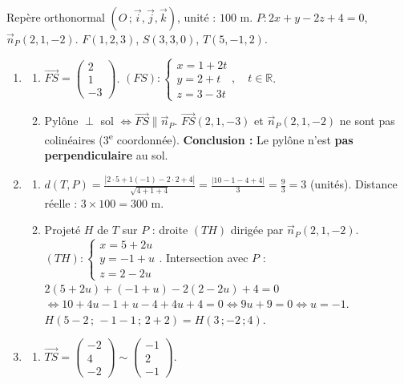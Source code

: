\documentclass[11pt]{article}
\begin{document}
\begin{corrige}
Repère orthonormal $(O\,;\vec{i},\vec{j},\vec{k})$, unité : $100$ m.
$P : 2x+y-2z+4=0$, $\vec{n}_P(2,1,-2)$.
$F(1,2,3)$, $S(3,3,0)$, $T(5,-1,2)$.
\begin{enumerate}
\item \begin{enumerate}
\item $\overrightarrow{FS} = \begin{pmatrix}2 \\ 1 \\ -3\end{pmatrix}$.
$(FS) : \begin{cases} x = 1 + 2t \\ y = 2 + t \\ z = 3 - 3t \end{cases},\quad t\in\mathbb{R}$.
\item Pylône $\perp$ sol $\iff \overrightarrow{FS} \parallel \vec{n}_P$.
$\overrightarrow{FS}(2,1,-3)$ et $\vec{n}_P(2,1,-2)$ ne sont pas colinéaires (3\textsuperscript{e} coordonnée).
\textbf{Conclusion :} Le pylône n'est \textbf{pas perpendiculaire} au sol.
\end{enumerate}
\item \begin{enumerate}
\item $d(T,P) = \frac{|2\cdot5 + 1(-1) -2\cdot2 + 4|}{\sqrt{4+1+4}} = \frac{|10-1-4+4|}{3} = \frac{9}{3} = 3$ (unités).
Distance réelle : $3 \times 100 = \boxed{300\text{ m}}$.
\item Projeté $H$ de $T$ sur $P$ : droite $(TH)$ dirigée par $\vec{n}_P(2,1,-2)$.
$(TH) : \begin{cases} x = 5 + 2u \\ y = -1 + u \\ z = 2 - 2u \end{cases}$.
Intersection avec $P$ : $2(5+2u) + (-1+u) -2(2-2u) + 4 = 0$
$\iff 10+4u -1+u -4+4u +4 = 0 \iff 9u + 9 = 0 \iff u = -1$.
$H(5-2\,;\,-1-1\,;\,2+2) = \boxed{H(3\,;-2\,;4)}$.
\end{enumerate}
\item \begin{enumerate}
\item $\overrightarrow{TS} = \begin{pmatrix}-2 \\ 4 \\ -2\end{pmatrix} \sim \begin{pmatrix}-1 \\ 2 \\ -1\end{pmatrix}$.

\end{enumerate}
\end{enumerate}
\end{corrige}
\end{document}
